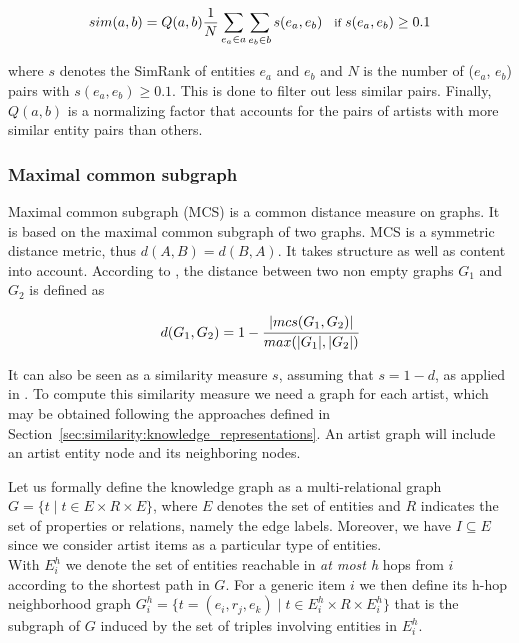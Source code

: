 \begin{equation}
\footnotesize
sim(a,b) = Q(a,b) \frac{1}{N} \sum_{e_a \in a} \sum_{e_b \in b} s(e_a, e_b)\quad \text{if}\ s(e_a, e_b) \geq 0.1
\end{equation}

where $s$ denotes the SimRank of entities $e_a$ and $e_b$ and $N$ is the number of ($e_a$, $e_b$) pairs with $s(e_a, e_b) \geq 0.1$. This is done to filter out less similar pairs.
%
Finally, $Q(a,b)$ is a normalizing factor that accounts for the pairs of artists with more similar entity pairs than others.

%


\subsubsection{Maximal common subgraph}\label{sec:similarity:method:sim:mcs} %

Maximal common subgraph (MCS) is a common distance measure on graphs. It is based on the maximal common subgraph of two graphs. MCS is a symmetric distance metric, thus $d(A,B)=d(B,A)$. It takes structure as well as content into account. According to \cite{Bunke1998}, the distance between two non empty graphs $G_{1}$ and $G_{2}$ is defined as

\begin{equation}
d(G_{1},G_{2}) = 1 - \cfrac{| mcs(G_{1},G_{2}) |}{max(|G_{1}|,|G_{2}|)}
\end{equation}

It can also be seen as a similarity measure $s$, assuming that $s=1-d$, as applied in \cite{Lux2005}. To compute this similarity measure we need a graph for each artist, which may be obtained following the approaches defined in Section~\ref{sec:similarity:knowledge_representations}. An artist graph will include an artist entity node and its neighboring nodes.

Let us formally define the knowledge graph as a multi-relational graph $G=\lbrace t \mid t \in E \times R \times E \rbrace$, where $E$ denotes the set of entities and $R$ indicates the set of properties or relations, namely the edge labels. Moreover, we have $I \subseteq E$ since we consider artist items as a particular type of entities.\\
With $E^h_i$ we denote the set of entities reachable in \textit{at most h} hops from $i$ according to the shortest path in $G$. For a generic item $i$ we then define its h-hop neighborhood graph $G^h_i=\lbrace t=(e_i,r_j,e_k) \mid t \in E^h_i \times R \times E^h_i \rbrace$ that is the subgraph of $G$ induced by the set of triples involving entities in $E^h_i$. 

